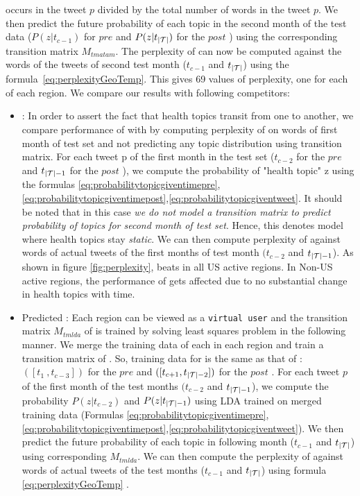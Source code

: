 occurs in the tweet $p$ divided by the total number of words in the tweet $p$.
We then predict the future probability of each topic in the 
second month of the test data ($P(z|t_{c-1})$ for $pre$ \change and $P(z|t_{|\mathcal{T}|})$ for the $post$ \change) using the corresponding transition matrix $M_{tmatam}$. The perplexity of \tmatam can now be computed against the words of the tweets of second test month ($t_{c-1}$ and $t_{|\mathcal{T}|}$)  using the formula~\ref{eq:perplexityGeoTemp}. This gives 69 values of perplexity, 
one for each \change of each region. We compare our results with following competitors:
\begin{itemize}
\item \atam: In order to assert the fact that health topics transit from one to another, we compare performance of \tmatam with \atam by computing perplexity of \atam on words of first month of test set and not predicting any topic distribution using transition matrix. For each tweet p of the first month in the test set ($t_{c-2}$ for the $pre$ \change and $t_{|\mathcal{T}|-1}$ for the $post$ \change), we compute the probability of "health topic" z using the formulas \ref{eq:probabilitytopicgiventimepre},\ref{eq:probabilitytopicgiventimepost},\ref{eq:probabilitytopicgiventweet}. It should be noted that in this case \textit{we do not model a transition matrix to predict probability of topics for second month of test set}. Hence, this denotes model where health topics stay \textit{static}. We can then compute perplexity of \atam against words of actual tweets of the first months of test month $(t_{c-2}$ and $t_{|\mathcal{T}|-1}$).  As shown in figure \ref{fig:perplexity}, \tmatam beats \atam in all US active regions. In Non-US active regions, the performance of \tmatam gets affected due to no substantial change in health topics with time.
\item Predicted \tmlda: Each region can be viewed as a 
\texttt{virtual user} and the transition matrix $M_{tmlda}$ of \tmlda is trained
by solving least squares problem in the following manner. We merge 
the training data of each \change in each region and train a transition
matrix of \tmlda. So, training data for \tmlda is the same as that of \tmatam: $([t_1\ ,t_{c-3}])$ for the $pre$ \change and $([t_{c+1},t_{|\mathcal{T}|-2}])$ for the $post$ \change.
For each tweet $p$ of the first month of the test months $(t_{c-2}$ and $t_{|\mathcal{T}|-1}$), we compute the 
probability $P(z|t_{c-2})$ and $P(z|t_{|\mathcal{T}|-1})$ using LDA trained on merged training data (Formulas \ref{eq:probabilitytopicgiventimepre},\ref{eq:probabilitytopicgiventimepost},\ref{eq:probabilitytopicgiventweet}). We 
then predict the future probability of each topic in following month ($t_{c-1}$ and $t_{|\mathcal{T}|}$)
using corresponding $M_{tmlda}$. We can then compute the perplexity of \tmlda 
against words of actual tweets of the test months ($t_{c-1}$ and $t_{|\mathcal{T}|}$) using formula \ref{eq:perplexityGeoTemp} . 
\end{itemize}
